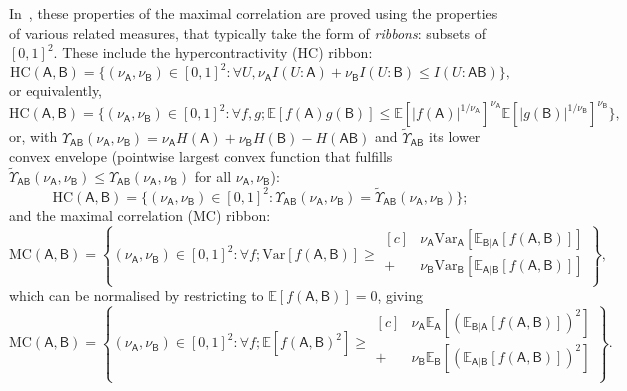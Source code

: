 \documentclass[10pt, a4paper]{article}
\numberwithin{equation}{section} %
\theoremstyle{definition}
\theoremstyle{plain}
\newcommand{\abs}[1]{\left\lvert#1\right\rvert}
\newcommand{\st}{\mathrel{:}} %
\newcommand{\?}{\mathrel{?}} %
\newcommand{\E}{\mathbb{E}} %
\newcommand{\Var}{\mathrm{Var}} %
\newcommand{\crv}[1]{\mathsf{#1}}
\newcommand{\HC}{\mathrm{HC}}
\newcommand{\MC}{\mathrm{MC}}
\begin{document}
    In~\cite{NLMonotones}, these properties of the maximal correlation are proved using the properties of various related measures, that typically take the form of \emph{ribbons}: subsets of \({[0,1]}^2\). These include the hypercontractivity (HC) ribbon:
    \begin{equation}
      \HC(\crv{A},\crv{B}) = \{(\nu_{\crv{A}}, \nu_{\crv{B}}) \in {[0,1]}^2 \st \forall U, \nu_{\crv{A}} I(U:\crv{A}) + \nu_{\crv{B}} I(U:\crv{B}) \leq I(U:\crv{AB})\},
    \end{equation}
    or equivalently,
    \begin{equation}
      \HC(\crv{A},\crv{B}) = \{(\nu_{\crv{A}}, \nu_{\crv{B}}) \in {[0,1]}^2 \st \forall f,g; \E[f(\crv{A})g(\crv{B})] \leq {\E[\abs{f(\crv{A})}^{1/\nu_{\crv{A}}}]}^{\nu_{\crv{A}}} {\E[\abs{g(\crv{B})}^{1/\nu_{\crv{B}}}]}^{\nu_{\crv{B}}} \},
    \end{equation}
    or, with \(\Upsilon_{\crv{AB}}(\nu_{\crv{A}}, \nu_{\crv{B}}) = \nu_{\crv{A}} H(\crv{A}) + \nu_{\crv{B}} H(\crv{B}) - H(\crv{AB})\) and \(\tilde{\Upsilon}_{\crv{AB}}\) its lower convex envelope (pointwise largest convex function that fulfills \(\tilde{\Upsilon}_{\crv{AB}}(\nu_{\crv{A}}, \nu_{\crv{B}}) \leq \Upsilon_{\crv{AB}}(\nu_{\crv{A}}, \nu_{\crv{B}})\) for all \(\nu_{\crv{A}}, \nu_{\crv{B}}\)):
    \begin{equation}
      \HC(\crv{A},\crv{B}) = \{(\nu_{\crv{A}}, \nu_{\crv{B}}) \in {[0,1]}^2 \st \Upsilon_{\crv{AB}}(\nu_{\crv{A}}, \nu_{\crv{B}}) = \tilde{\Upsilon}_{\crv{AB}}(\nu_{\crv{A}}, \nu_{\crv{B}}) \};
    \end{equation}
    and the maximal correlation (MC) ribbon:
    \begin{equation}
      \MC(\crv{A},\crv{B}) = \left\{ 
        (\nu_{\crv{A}}, \nu_{\crv{B}}) \in {[0,1]}^2 \st \forall f; \Var[f(\crv{A},\crv{B})] \geq 
        \begin{aligned}[c]
          & \nu_{\crv{A}} \Var_{\crv{A}}[\E_{\crv{B}|\crv{A}}[f(\crv{A},\crv{B})]] \\
          + & \nu_{\crv{B}} \Var_{\crv{B}}[\E_{\crv{A}|\crv{B}}[f(\crv{A},\crv{B})]] \\
        \end{aligned}
      \right\},
    \end{equation}
    which can be normalised by restricting to \(\E[f(\crv{A},\crv{B})] = 0\), giving
    \begin{equation}
      \MC(\crv{A},\crv{B}) = \left\{(\nu_{\crv{A}}, \nu_{\crv{B}}) \in {[0,1]}^2 \st \forall f; \E[{f(\crv{A},\crv{B})}^2] \geq 
        \begin{aligned}[c]
          & \nu_{\crv{A}} \E_{\crv{A}}[{(\E_{\crv{B}|\crv{A}}[f(\crv{A},\crv{B})])}^2] \\ + & \nu_{\crv{B}} \E_{\crv{B}}[{(\E_{\crv{A}|\crv{B}}[f(\crv{A},\crv{B})])}^2] \\
        \end{aligned}
      \right\}.
    \end{equation}
\end{document}
